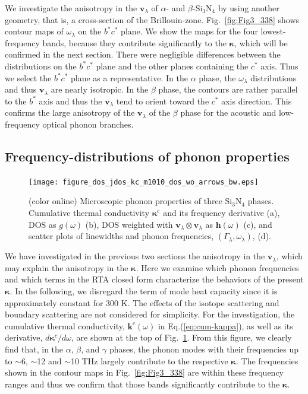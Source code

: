 \documentclass[twocolumn,amsmath,amssymb,a4paper,prb,superscriptaddress,floatfix]{revtex4-1}
\begin{document}
We investigate the anisotropy in the $\mathbf{v}_{\lambda}$ of $\alpha$- and
$\beta$-Si$_3$N$_4$ by using another geometry, that is, a cross-section of the
Brillouin-zone.  Fig.~\ref{fig:Fig3_338} shows contour maps of
$\omega_{\lambda}$  on the $b^*c^*$ plane.  We show the maps for the four
lowest-frequency bands, because they contribute significantly to the
$\boldsymbol{\kappa}$, which will be confirmed in the next section. There were
negligible differences between the distributions on the $b^*c^*$ plane and the
other planes containing the $c^*$ axis.  Thus we select the $b^*c^*$ plane as a
representative.  In the $\alpha$ phase, the $\omega_{\lambda}$ distributions and
thus $\mathbf{v}_{\lambda}$ are nearly isotropic. In the $\beta$ phase, the
contours are rather parallel to the $b^*$ axis and thus the
$\mathbf{v}_{\lambda}$ tend to orient toward the $c^*$ axis direction. This
confirms the large anisotropy of the $\mathbf{v}_{\lambda}$ of the $\beta$ phase
for the acoustic and low-frequency optical phonon branches.

\subsection{Frequency-distributions of phonon properties}

\begin{figure}[ht]
 \begin{center}
	 \texttt{[image: figure\_dos\_jdos\_kc\_m1010\_dos\_wo\_arrows\_bw.eps]}
  \caption{(color online) Microscopic phonon properties of three Si$_3$N$_4$
	  phases. Cumulative thermal conductivity $\boldsymbol{\kappa}^\text{c}$ and
	  its frequency derivative
	  (a), DOS as $g(\omega)$ (b), DOS weighted with $\mathbf{v}_\lambda \otimes
	  \mathbf{v}_\lambda$ as $\boldsymbol{h}(\omega)$ (c), and scatter plots of
	  linewidths and phonon frequencies, $(\Gamma_\lambda,\omega_\lambda)$, (d).
  \label{fig:Fig5_338_rev} }
 \end{center}
\end{figure}

We have investigated in the previous two sections the anisotropy in the
$\mathbf{v}_\lambda$, which may explain the anisotropy in the
$\boldsymbol{\kappa}$. Here we examine which phonon frequencies and which terms
in the RTA closed form characterize the behaviors of the present
$\boldsymbol{\kappa}$. In the following, we disregard the term of mode heat
capacity since it is approximately constant for 300 K.
The effects of the isotope scattering and boundary scattering are not considered
for simplicity.
For the investigation, the cumulative thermal conductivity,
$\boldsymbol{k}^c(\omega)$ in Eq.(\ref{eq:cum-kappa}), as well as its
derivative, $d\boldsymbol{\kappa}^c/d\omega$, are shown at the top of
Fig.~\ref{fig:Fig5_338_rev}.  From this figure, we clearly find that, in the
$\alpha$, $\beta$, and $\gamma$ phases, the phonon modes with their frequencies
up to $\sim$6, $\sim$12 and $\sim$10 THz largely contribute to the respective
$\boldsymbol{\kappa}$. The frequencies shown in the contour maps in
Fig.~\ref{fig:Fig3_338} are within these frequency ranges and thus we confirm
that those bands significantly contribute to the $\boldsymbol{\kappa}$.  
\end{document}
